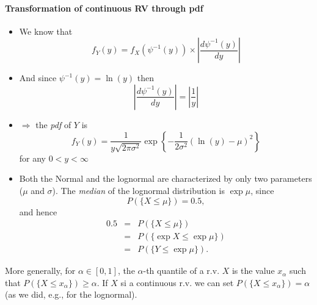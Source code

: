 \documentclass[smaller]{beamer}\usepackage[]{graphicx}\usepackage[]{color}
\renewcommand{\Pr}{P}
\newenvironment{stepitemize}{\begin{itemize}[<+->]}{\end{itemize} }
\begin{document}
\begin{frame}{\secname}
  \framesubtitle{Transformation of continuous RV through pdf }
  \begin{example}[continued]
  \begin{stepitemize}
  \item We know that
  \begin{equation*}
  f_{Y}\left( y\right) =f_{X}\left( \psi ^{-1}\left( y\right) \right) \times
  \left\vert \frac{d\psi ^{-1}\left( y\right) }{dy}\right\vert
  \end{equation*}

  \item And since $\psi ^{-1}\left( y\right) =\ln (y)$ then
  \begin{equation*}
  \left\vert \frac{d\psi ^{-1}\left( y\right) }{dy}\right\vert =\left\vert
  \frac{1}{y}\right\vert
  \end{equation*}

  \item $\Rightarrow $ the \emph{pdf} of $Y$ is
  \begin{equation*}
  f_{Y}\left( y\right) =\frac{1}{y\sqrt{2\pi \sigma ^{2}}}\exp{ \left\{ -\frac{1%
  }{2\sigma ^{2}}\left( \ln (y)-\mu \right) ^{2}\right\}}
  \end{equation*}
  for any $0<y<\infty $
  \end{stepitemize}
  \end{example}
\end{frame}

\begin{frame}{\secname}
  \begin{example}[continued]
  \begin{stepitemize}
  \item Both the Normal and the lognormal are characterized by
  only two parameters ($\mu$ and $\sigma$). The \emph{median} of the lognormal distribution is $\exp{
  \mu } $, since $$
  \Pr \left( \{ X\leq \mu \} \right) = 0.5,
  $$
  and hence%
  \begin{eqnarray*}
  0.5 &=&\Pr \left(\{ X\leq \mu \}\right) \\
  &=&\Pr \left( \{\exp{X} \leq \exp{ \mu }\} \right) \\
  &=&\Pr \left( \{Y\leq \exp{ \mu }\} \right).
  \end{eqnarray*}
  \end{stepitemize}
  \end{example}
  More generally, for $\alpha\in[0,1]$, the $\alpha$-th quantile of a r.v. $X$ is the value $x_\alpha$ such that $P(\{X \leq x_\alpha\})\geq\alpha$. If $X$ si a continuous r.v.  we can set $P(\{X \leq x_\alpha\})=\alpha$ (as we did, e.g., for the lognormal).
\end{frame}
\end{document}
